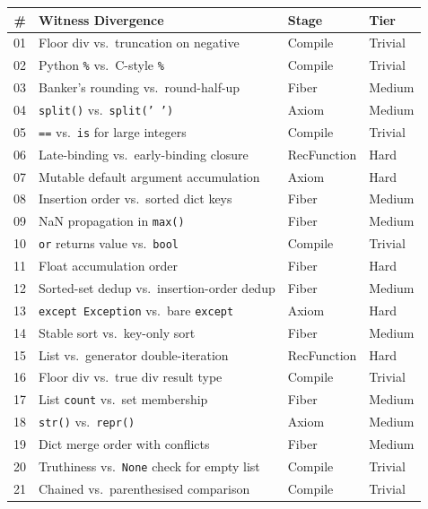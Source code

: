 \begin{center}
\small
\begin{tabular}{r p{5cm} l l}
  \textbf{\#} & \textbf{Witness Divergence} & \textbf{Stage} & \textbf{Tier} \\
  \hline
  01 & Floor div vs.\ truncation on negative &
       Compile & Trivial \\
  02 & Python \texttt{\%} vs.\ C-style \texttt{\%} &
       Compile & Trivial \\
  03 & Banker's rounding vs.\ round-half-up &
       Fiber & Medium \\
  04 & \texttt{split()} vs.\ \texttt{split(' ')} &
       Axiom & Medium \\
  05 & \texttt{==} vs.\ \texttt{is} for large integers &
       Compile & Trivial \\
  06 & Late-binding vs.\ early-binding closure &
       RecFunction & Hard \\
  07 & Mutable default argument accumulation &
       Axiom & Hard \\
  08 & Insertion order vs.\ sorted dict keys &
       Fiber & Medium \\
  09 & NaN propagation in \texttt{max()} &
       Fiber & Medium \\
  10 & \texttt{or} returns value vs.\ \texttt{bool} &
       Compile & Trivial \\
  11 & Float accumulation order &
       Fiber & Hard \\
  12 & Sorted-set dedup vs.\ insertion-order dedup &
       Fiber & Medium \\
  13 & \texttt{except Exception} vs.\ bare \texttt{except} &
       Axiom & Hard \\
  14 & Stable sort vs.\ key-only sort &
       Fiber & Medium \\
  15 & List vs.\ generator double-iteration &
       RecFunction & Hard \\
  16 & Floor div vs.\ true div result type &
       Compile & Trivial \\
  17 & List \texttt{count} vs.\ set membership &
       Fiber & Medium \\
  18 & \texttt{str()} vs.\ \texttt{repr()} &
       Axiom & Medium \\
  19 & Dict merge order with conflicts &
       Fiber & Medium \\
  20 & Truthiness vs.\ \texttt{None} check for empty list &
       Compile & Trivial \\
  21 & Chained vs.\ parenthesised comparison &
       Compile & Trivial \\

\end{tabular}
\end{center}
